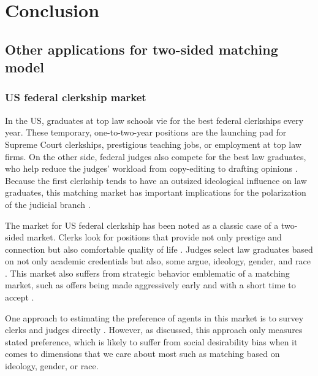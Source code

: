 \chapter{Conclusion}
\label{chap:conclusion}

\section{Other applications for two-sided matching model}

\subsection{US federal clerkship market}

In the US, graduates at top law schools vie for the best federal clerkships
every year. These temporary, one-to-two-year positions are the launching pad for
Supreme Court clerkships, prestigious teaching jobs, or employment at top law
firms. On the other side, federal judges also compete for the best law
graduates, who help reduce the judges' workload from copy-editing to drafting
opinions \citep{Gulati2016, Posner2001}. Because the first clerkship tends to
have an outsized ideological influence on law graduates, this matching market
has important implications for the polarization of the judicial branch
\citep{Ditslear2001, Liptak2007}.

The market for US federal clerkship has been noted as a classic case of a
two-sided market. Clerks look for positions that provide not only prestige and
connection but also comfortable quality of life \citep{Posner2001}. Judges
select law graduates based on not only academic credentials but also, some
argue, ideology, gender, and race \citep{Slotnick1984}. This market also suffers
from strategic behavior emblematic of a matching market, such as offers being
made aggressively early and with a short time to accept \citep{Posner2001,
  Posner2007}.

One approach to estimating the preference of agents in this market is to survey
clerks and judges directly \citep{Peppers2008}. However, as discussed, this
approach only measures stated preference, which is likely to suffer from social
desirability bias when it comes to dimensions that we care about most such as
matching based on ideology, gender, or race.


